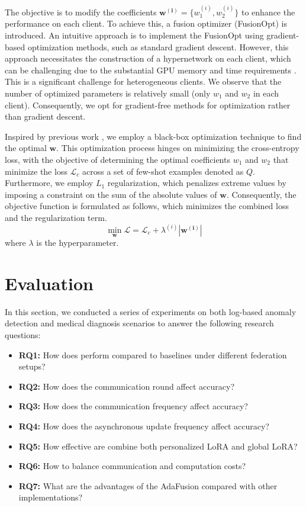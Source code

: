 \documentclass[sigconf]{acmart}
\newcommand\our{\text{FDLoRA}}
\begin{document}
The objective is to modify the coefficients $\mathbf{w^{(i)}} = \{w_1^{(i)}, w_2^{(i)}\}$ to enhance the performance on each client. To achieve this, a fusion optimizer (FusionOpt) is introduced. An intuitive approach is to implement the FusionOpt using gradient-based optimization methods, such as standard gradient descent. However, this approach necessitates the construction of a hypernetwork on each client, which can be challenging due to the substantial GPU memory and time requirements \cite{huang2023lorahub}. This is a significant challenge for heterogeneous clients. We observe that the number of optimized parameters is relatively small (only $w_1$ and $w_2$ in each client). Consequently, we opt for gradient-free methods for optimization rather than gradient descent.
\par
Inspired by previous work \cite{huang2023lorahub}, we employ a black-box optimization technique to find the optimal $\mathbf{w}$. This optimization process hinges on minimizing the cross-entropy loss, with the objective of determining the optimal coefficients $w_1$ and $w_2$  that minimize the loss $\mathcal{L}_{c}$ across a set of few-shot examples denoted as $Q$. Furthermore, we employ $L_1$ regularization, which penalizes extreme values by imposing a constraint on the sum of the absolute values of $\mathbf{w}$. Consequently, the objective function is formulated as follows, which minimizes the combined loss and the regularization term.
\begin{equation}
   \min_{\mathbf{w}} \mathcal{L} = \mathcal{L}_{c} + \lambda^{(i)} |\mathbf{w^{(i)}}| 
\end{equation}
where $\lambda$ is the hyperparameter.

\section{Evaluation} \label{sec:evaluation}
In this section, we conducted a series of experiments on both log-based anomaly detection and medical diagnosis scenarios to answer the following research questions:
\begin{itemize}
    \item \textbf{RQ1:} How does \our{} perform compared to baselines under different federation setups?
    \item \textbf{RQ2:} How does the communication round affect accuracy?
    \item \textbf{RQ3:} How does the communication frequency affect accuracy?
    \item \textbf{RQ4:} How does the asynchronous update frequency affect accuracy?
    \item \textbf{RQ5:} How effective are combine both personalized LoRA and global LoRA?
    \item \textbf{RQ6:} How to balance communication and computation costs?
    \item \textbf{RQ7:} What are the advantages of the AdaFusion compared with other implementations?
\end{itemize}
\end{document}
